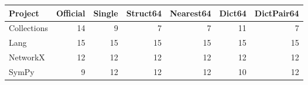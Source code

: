 \begin{tabular}{lrrrrrr}
\toprule
Project & Official & Single & Struct64 & Nearest64 & Dict64 & DictPair64 \\
\midrule
Collections & 14 & 9 & 7 & 7 & 11 & 7 \\
Lang & 15 & 15 & 15 & 15 & 15 & 15 \\
NetworkX & 12 & 12 & 12 & 12 & 12 & 12 \\
SymPy & 9 & 12 & 12 & 12 & 10 & 12 \\
\bottomrule
\end{tabular}
